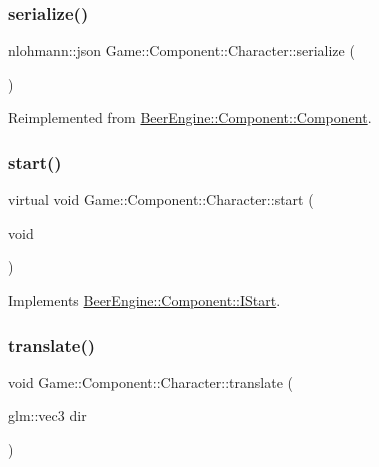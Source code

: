 \subsubsection{\texorpdfstring{serialize()}{serialize()}}
{\footnotesize\ttfamily nlohmann\+::json Game\+::\+Component\+::\+Character\+::serialize (\begin{DoxyParamCaption}{ }\end{DoxyParamCaption})\hspace{0.3cm}{\ttfamily [virtual]}}



Reimplemented from \mbox{\hyperlink{class_beer_engine_1_1_component_1_1_component_a4d82d8a6b22b93514e0585fa4073041f}{Beer\+Engine\+::\+Component\+::\+Component}}.

\mbox{\label{class_game_1_1_component_1_1_character_ab5ffa080b89ab20becf30a27a881d4d4}} 
\subsubsection{\texorpdfstring{start()}{start()}}
{\footnotesize\ttfamily virtual void Game\+::\+Component\+::\+Character\+::start (\begin{DoxyParamCaption}\item[{void}]{ }\end{DoxyParamCaption})\hspace{0.3cm}{\ttfamily [virtual]}}



Implements \mbox{\hyperlink{class_beer_engine_1_1_component_1_1_i_start_aa3e25e86e20c46cdaefc6f6d7f21e495}{Beer\+Engine\+::\+Component\+::\+I\+Start}}.

\mbox{\label{class_game_1_1_component_1_1_character_a1c5583b4e0fa4c9a38810e67dd247371}} 
\subsubsection{\texorpdfstring{translate()}{translate()}}
{\footnotesize\ttfamily void Game\+::\+Component\+::\+Character\+::translate (\begin{DoxyParamCaption}\item[{glm\+::vec3}]{dir }\end{DoxyParamCaption})}

